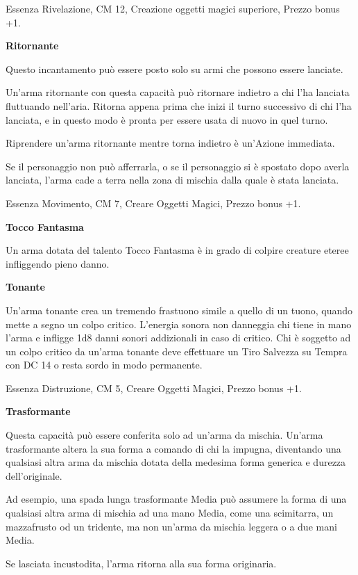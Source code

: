 \documentclass[a4paper,11pt,twoside,openany]{book}
\begin{document}
Essenza Rivelazione, CM 12, Creazione oggetti magici superiore, Prezzo bonus +1.

\textbf{Ritornante}

Questo incantamento può essere posto solo su armi che possono essere
lanciate.

Un'arma ritornante con questa capacità può ritornare indietro a chi l'ha lanciata fluttuando nell'aria. Ritorna appena prima che inizi il turno successivo di chi l'ha lanciata, e in questo modo è pronta per essere usata di nuovo in quel turno.

Riprendere un'arma ritornante mentre torna indietro è un'Azione immediata.

Se il personaggio non può afferrarla, o se il personaggio si è spostato dopo averla lanciata, l'arma cade a terra nella zona di mischia dalla quale è stata lanciata.

Essenza Movimento, CM 7, Creare Oggetti Magici, Prezzo bonus +1.

\textbf{Tocco Fantasma}

Un arma dotata del talento Tocco Fantasma è in grado di colpire creature eteree infliggendo pieno danno.

\textbf{Tonante}

Un'arma tonante crea un tremendo frastuono simile a quello di un tuono, quando mette a segno un colpo critico. L'energia sonora non danneggia chi tiene in mano l'arma e infligge 1d8 danni sonori addizionali in caso di critico. Chi è soggetto ad un colpo critico da un'arma tonante deve effettuare un Tiro Salvezza su Tempra con DC 14 o resta sordo in modo permanente.

Essenza Distruzione, CM 5, Creare Oggetti Magici, Prezzo bonus +1.

\textbf{Trasformante}

Questa capacità può essere conferita solo ad un'arma da mischia. Un'arma trasformante altera la sua forma a comando di chi la impugna, diventando una qualsiasi altra arma da mischia dotata della medesima forma generica e durezza dell'originale.

Ad esempio, una spada lunga trasformante Media può assumere la forma di una qualsiasi altra arma di mischia ad una mano Media, come una scimitarra, un mazzafrusto od un tridente, ma non un'arma da mischia leggera o a due mani Media.

Se lasciata incustodita, l'arma ritorna alla sua forma originaria.
\end{document}
